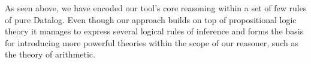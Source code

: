 As seen above, we have encoded our tool's core reasoning within a set of few rules of pure Datalog.
Even though our approach builds on top of propositional logic theory it manages to express
several logical rules of inference and forms the basis for introducing more powerful theories within
the scope of our reasoner, such as the theory of arithmetic.

